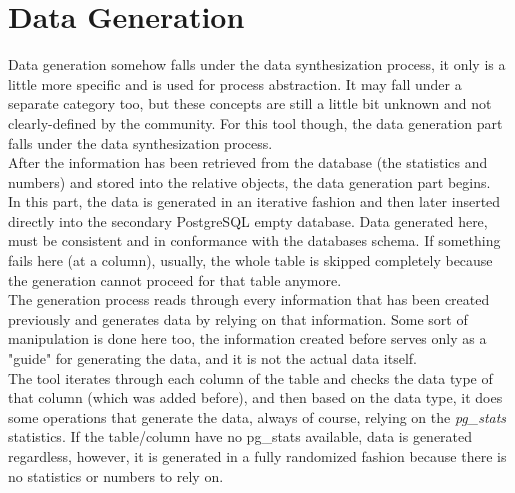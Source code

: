 \section{Data Generation}
Data generation somehow falls under the data synthesization process, it only is a little more specific and is used for process abstraction. It may fall under a separate category too, but these concepts are still a little bit unknown and not clearly-defined by the community. For this tool though, the data generation part falls under the data synthesization process.\\
\newline
After the information has been retrieved from the database (the statistics and numbers) and stored into the relative objects, the data generation part begins.\\
In this part, the data is generated in an iterative fashion and then later inserted directly into the secondary PostgreSQL empty database. Data generated here, must be consistent and in conformance with the databases schema. If something fails here (at a column), usually, the whole table is skipped completely because the generation cannot proceed for that table anymore.\\
The generation process reads through every information that has been created previously and generates data by relying on that information. Some sort of manipulation is done here too, the information created before serves only as a "guide" for generating the data, and it is not the actual data itself.\\
The tool iterates through each column of the table and checks the data type of that column (which was added before), and then based on the data type, it does some operations that generate the data, always of course, relying on the \textit{pg\_stats} statistics. If the table/column have no pg\_stats available, data is generated regardless, however, it is generated in a fully randomized fashion because there is no statistics or numbers to rely on.